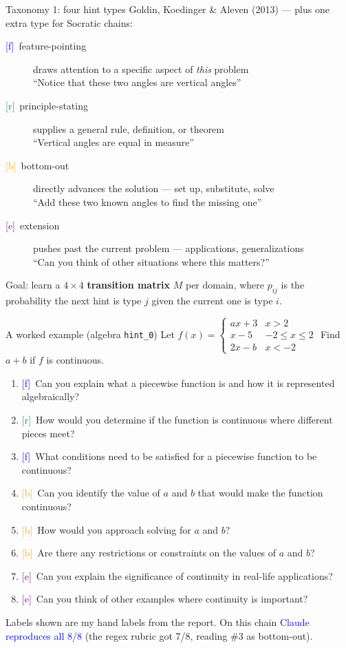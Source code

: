 \documentclass[10pt,aspectratio=169]{beamer}
\newcommand{\good}[1]{\textcolor{blue}{#1}}
\newcommand{\hf}{\textcolor{blue}{[f]}}
\newcommand{\hr}{\textcolor{teal}{[r]}}
\newcommand{\hb}{\textcolor{orange}{[b]}}
\newcommand{\he}{\textcolor{purple}{[e]}}
\begin{document}
\begin{frame}{Taxonomy 1: four hint types}
  Goldin, Koedinger \& Aleven (2013) --- plus one extra type for Socratic chains:
  \medskip
  \begin{description}
    \item[\hf~feature-pointing] draws attention to a specific aspect of \emph{this}
          problem \\ {\small ``Notice that these two angles are vertical angles''}
    \item[\hr~principle-stating] supplies a general rule, definition, or theorem \\
          {\small ``Vertical angles are equal in measure''}
    \item[\hb~bottom-out] directly advances the solution --- set up, substitute, solve \\
          {\small ``Add these two known angles to find the missing one''}
    \item[\he~extension] pushes past the current problem --- applications, generalizations \\
          {\small ``Can you think of other situations where this matters?''}
  \end{description}
  \medskip
  Goal: learn a $4\times4$ \textbf{transition matrix} $M$ per domain, where $p_{ij}$ is
  the probability the next hint is type $j$ given the current one is type $i$.
\end{frame}

\begin{frame}{A worked example (algebra \texttt{hint\_0})}
  \small
  Let
  $f(x)=\begin{cases} ax+3 & x>2\\ x-5 & -2\le x\le 2\\ 2x-b & x<-2 \end{cases}$
  \quad Find $a+b$ if $f$ is continuous.
  \medskip
  \begin{enumerate}\footnotesize
    \item \hf~Can you explain what a piecewise function is and how it is represented algebraically?
    \item \hr~How would you determine if the function is continuous where different pieces meet?
    \item \hf~What conditions need to be satisfied for a piecewise function to be continuous?
    \item \hb~Can you identify the value of $a$ and $b$ that would make the function continuous?
    \item \hb~How would you approach solving for $a$ and $b$?
    \item \hb~Are there any restrictions or constraints on the values of $a$ and $b$?
    \item \he~Can you explain the significance of continuity in real-life applications?
    \item \he~Can you think of other examples where continuity is important?
  \end{enumerate}
  \medskip
  \normalsize
  Labels shown are my hand labels from the report. On this chain
  \good{Claude reproduces all 8/8} (the regex rubric got 7/8, reading \#3 as bottom-out).
\end{frame}
\end{document}
